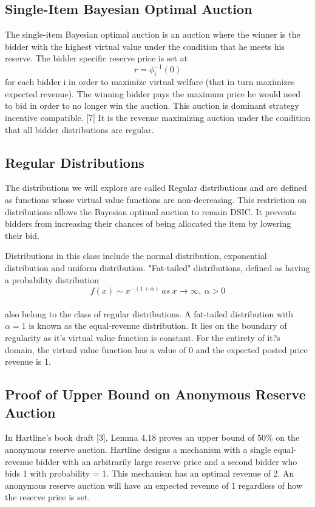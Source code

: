 \documentclass{acm_proc_article-sp}
\begin{document}
\subsection{Single-Item Bayesian Optimal Auction}
The single-item Bayesian optimal auction is an auction where the winner is the bidder with the highest virtual value under the condition that he meets his reserve.  The bidder specific reserve price is set at \[ r = \phi_{i}^{-1}(0)\] for each bidder i in order to maximize virtual welfare (that in turn maximizes expected revenue). The winning bidder pays the maximum price he would need to bid in order to no longer win the auction. This auction is dominant strategy incentive compatible. [7] It is the revenue maximizing auction under the condition that all bidder distributions are regular. 

\subsection{Regular Distributions}
The distributions we will explore are called Regular distributions and are defined as functions whose virtual value functions are non-decreasing. This restriction on distributions allows the Bayesian optimal auction to remain DSIC. It prevents bidders from increasing their chances of being allocated the item by lowering their bid.

Distributions in this class include the normal distribution, exponential distribution and uniform distribution. "Fat-tailed" distributions, defined as having a probability distribution
\[  f(x) \sim x^{-(1 + \alpha)} \: as \: x \rightarrow \infty ,\: \alpha > 0 \] \\ also belong to the class of regular distributions. A fat-tailed distribution with $\alpha = 1$ is known as the equal-revenue distribution. It lies on the boundary of regularity as it's virtual value function is constant. For the entirety of it?s domain, the virtual value function has a value of 0 and the expected posted price revenue is 1.

\subsection{Proof of Upper Bound on Anonymous Reserve Auction}
In Hartline's book draft [3], Lemma 4.18 proves an upper bound of 50\% on the anonymous reserve auction. Hartline designs a mechanism with a single equal-revenue bidder with an arbitrarily large reserve price and a second bidder who bids 1 with probability = 1. This mechanism has an optimal revenue of 2.  An anonymous reserve auction will have an expected revenue of 1 regardless of how the reserve price is set. 
\end{document}
